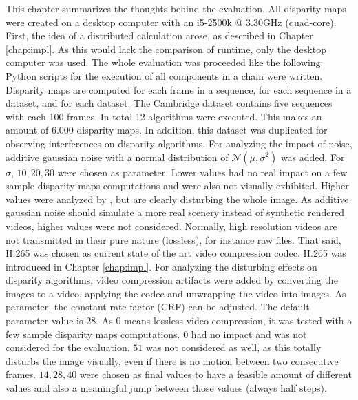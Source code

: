 This chapter summarizes the thoughts behind the evaluation.
All disparity maps were created on a desktop computer with an i5-2500k @ 3.30GHz (quad-core).
First, the idea of a distributed calculation arose, as described in Chapter \ref{chap:impl}.
As this would lack the comparison of runtime, only the desktop computer was used.
\newline\newline\noindent The whole evaluation was proceeded like the following:
Python scripts for the execution of all components in a chain were written.
Disparity maps are computed for each frame in a sequence, for each sequence in a dataset, and for each dataset.
The Cambridge dataset contains five sequences with each 100 frames.
In total 12 algorithms were executed.
This makes an amount of $6.000$ disparity maps.
\newline\newline\noindent In addition, this dataset was duplicated for observing interferences on disparity algorithms.
For analyzing the impact of noise, additive gaussian noise with a normal distribution of $\mathcal{N}(\mu,\sigma^2)$ was added.
For $\sigma$, $10, 20, 30$ were chosen as parameter.
Lower values had no real impact on a few sample disparity maps computations and were also not visually exhibited.
Higher values were analyzed by \citeauthor{richardt2010real} \citep{richardt2010real}, but are clearly disturbing the whole image.
As additive gaussian noise should simulate a more real scenery instead of synthetic rendered videos, higher values were not considered.
\newline\newline\noindent Normally, high resolution videos are not transmitted in their pure nature (lossless), for instance raw files.
That said, H.265 was chosen as current state of the art video compression codec.
H.265 was introduced in Chapter \ref{chap:impl}.
For analyzing the disturbing effects on disparity algorithms, video compression artifacts were added by converting the images to a video, applying the codec and unwrapping the video into images.
As parameter, the constant rate factor (CRF) can be adjusted.
The default parameter value is $28$.
As $0$ means lossless video compression, it was tested with a few sample disparity maps computations.
$0$ had no impact and was not considered for the evaluation.
$51$ was not considered as well, as this totally disturbs the image visually, even if there is no motion between two consecutive frames.
$14, 28, 40$ were chosen as final values to have a feasible amount of different values and also a meaningful jump between those values (always half steps).
